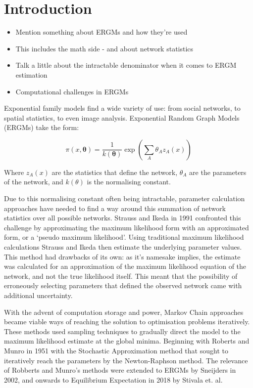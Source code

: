 \section{Introduction}
\label{introduction}
\begin{itemize}
\item Mention something about ERGMs and how they're used
\item This includes the math side - and about network statistics
\item Talk a little about the intractable denominator when it comes to ERGM estimation
\item Computational challenges in ERGMs
\end{itemize}
Exponential family models find a wide variety of use: from social networks, to spatial statistics, to even image analysis. Exponential Random Graph Models (ERGMs) take the form:

\begin{equation}
\label{eq:ergm_form}
\pi(x, \boldsymbol{\theta}) = \frac{1}{k(\boldsymbol{\theta})}\exp{\left(\sum_A{\theta_Az_A(x)}\right)}
\end{equation}

Where $z_A(x)$ are the statistics that define the network, $\theta_A$ are the parameters of the network, and $k(\theta)$ is the normalising constant. 

Due to this normalising constant often being intractable, parameter calculation approaches have needed to find a way around this summation of network statistics over all possible networks. Strauss and Ikeda in 1991 confronted this challenge by approximating the maximum likelihood form with an approximated form, or a `pseudo maximum likelihood'. Using traditional maximum likelihood calculations Strauss and Ikeda then estimate the underlying parameter values. This method had drawbacks of its own: as it's namesake implies, the estimate was calculated for an approximation of the maximum likelihood equation of the network, and not the true likelihood itself. This meant that the possibility of erroneously selecting parameters that defined the observed network came with additional uncertainty. 

With the advent of computation storage and power, Markov Chain approaches became viable ways of reaching the solution to optimisation problems iteratively. These methods used sampling techniques to gradually direct the model to the maximum likelihood estimate at the global minima. Beginning with Roberts and Munro in 1951 with the Stochastic Approximation method that sought to iteratively reach the parameters by the Newton-Raphson method. The relevance of Robberts and Munro's methods were extended to ERGMs by Sneijders in 2002, and onwards to Equilibrium Expectation in 2018 by Stivala et. al. 

